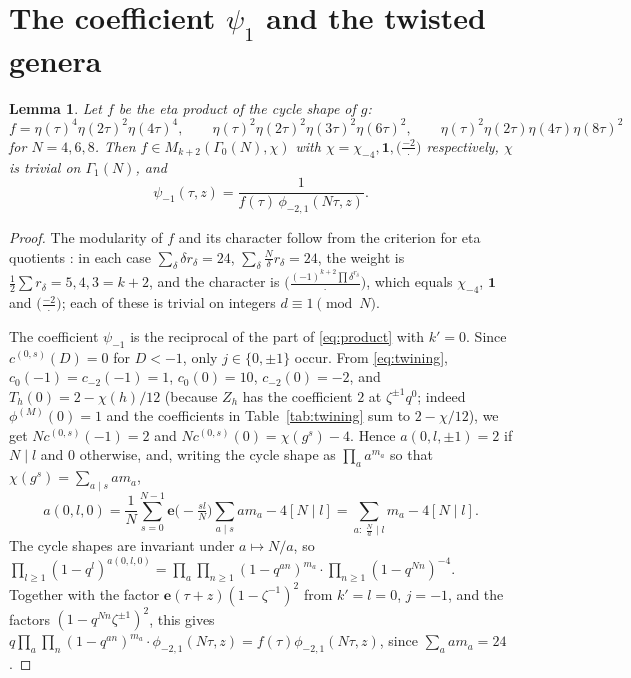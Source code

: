 \documentclass[11pt]{amsart}
\newtheorem{lemma}[theorem]{Lemma}
\theoremstyle{definition}
\newcommand{\e}{\mathbf{e}}
\begin{document}
\section{The coefficient \texorpdfstring{$\psi_1$}{psi\_1} and the twisted genera}\label{sec:genera}

\begin{lemma}\label{lem:psim1}
Let $f$ be the eta product of the cycle shape of $g$:
\[
f=\eta(\tau)^4\eta(2\tau)^2\eta(4\tau)^4,\qquad \eta(\tau)^2\eta(2\tau)^2\eta(3\tau)^2\eta(6\tau)^2,\qquad \eta(\tau)^2\eta(2\tau)\eta(4\tau)\eta(8\tau)^2
\]
for $N=4,6,8$. Then $f\in M_{k+2}(\Gamma_0(N),\chi)$ with $\chi=\chi_{-4},\mathbf 1,\bigl(\frac{-2}\cdot\bigr)$ respectively, $\chi$ is trivial on $\Gamma_1(N)$, and
\[
\psi_{-1}(\tau,z)=\frac1{f(\tau)\,\phi_{-2,1}(N\tau,z)} .
\]
\end{lemma}

\begin{proof}
The modularity of $f$ and its character follow from the criterion for eta quotients \cite[Theorem~1.64]{Ono04}: in each case $\sum_\delta\delta r_\delta=24$, $\sum_\delta\frac N\delta r_\delta=24$, the weight is $\frac12\sum r_\delta=5,4,3=k+2$, and the character is $\bigl(\frac{(-1)^{k+2}\prod\delta^{r_\delta}}{\cdot}\bigr)$, which equals $\chi_{-4}$, $\mathbf 1$ and $\bigl(\frac{-2}\cdot\bigr)$; each of these is trivial on integers $d\equiv1\pmod N$.

The coefficient $\psi_{-1}$ is the reciprocal of the part of \eqref{eq:product} with $k'=0$. Since $c^{(0,s)}(D)=0$ for $D<-1$, only $j\in\{0,\pm1\}$ occur. From \eqref{eq:twining}, $c_0(-1)=c_{-2}(-1)=1$, $c_0(0)=10$, $c_{-2}(0)=-2$, and $T_h(0)=2-\chi(h)/12$ (because $Z_h$ has the coefficient $2$ at $\zeta^{\pm1}q^0$; indeed $\phi^{(M)}(0)=1$ and the coefficients in Table~\ref{tab:twining} sum to $2-\chi/12$), we get $Nc^{(0,s)}(-1)=2$ and $Nc^{(0,s)}(0)=\chi(g^s)-4$. Hence $a(0,l,\pm1)=2$ if $N\mid l$ and $0$ otherwise, and, writing the cycle shape as $\prod_aa^{m_a}$ so that $\chi(g^s)=\sum_{a\mid s}am_a$,
\[
a(0,l,0)=\frac1N\sum_{s=0}^{N-1}\e\bigl(-\tfrac{sl}N\bigr)\sum_{a\mid s}am_a-4[N\mid l]=\sum_{a:\ \frac Na\mid l}m_a-4[N\mid l].
\]
The cycle shapes are invariant under $a\mapsto N/a$, so $\prod_{l\ge1}(1-q^l)^{a(0,l,0)}=\prod_a\prod_{n\ge1}(1-q^{an})^{m_a}\cdot\prod_{n\ge1}(1-q^{Nn})^{-4}$. Together with the factor $\e(\tau+z)(1-\zeta^{-1})^2$ from $k'=l=0$, $j=-1$, and the factors $(1-q^{Nn}\zeta^{\pm1})^2$, this gives $q\prod_a\prod_n(1-q^{an})^{m_a}\cdot\phi_{-2,1}(N\tau,z)=f(\tau)\phi_{-2,1}(N\tau,z)$, since $\sum_a am_a=24$.
\end{proof}
\end{document}
